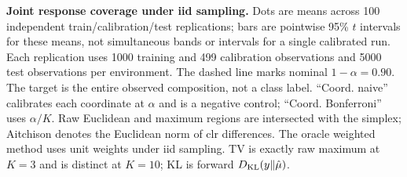 \textbf{Joint response coverage under iid sampling.} Dots are means across 100 independent train/calibration/test replications; bars are pointwise 95\% $t$ intervals for these means, not simultaneous bands or intervals for a single calibrated run. Each replication uses 1000 training and 499 calibration observations and 5000 test observations per environment. The dashed line marks nominal $1-\alpha=0.90$. The target is the entire observed composition, not a class label. ``Coord. naive'' calibrates each coordinate at $\alpha$ and is a negative control; ``Coord. Bonferroni'' uses $\alpha/K$. Raw Euclidean and maximum regions are intersected with the simplex; Aitchison denotes the Euclidean norm of clr differences. The oracle weighted method uses unit weights under iid sampling. TV is exactly raw maximum at $K=3$ and is distinct at $K=10$; KL is forward $D_{\rm KL}(y\Vert\hat\mu)$.
